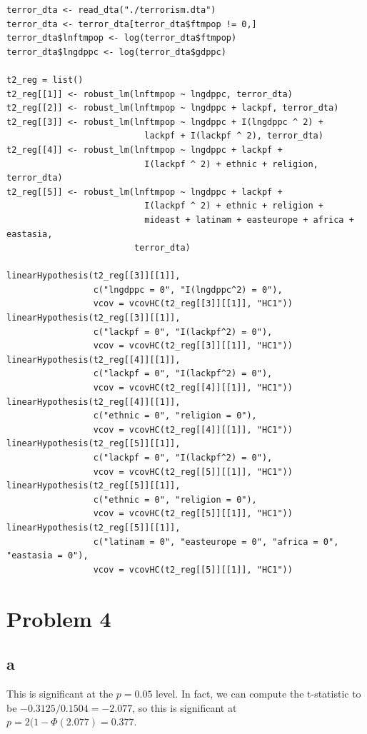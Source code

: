 \documentclass[12pt,letterpaper]{article}
\theoremstyle{definition}
\begin{document}
\begin{Verbatim}[fontsize=\small]
terror_dta <- read_dta("./terrorism.dta")
terror_dta <- terror_dta[terror_dta$ftmpop != 0,]
terror_dta$lnftmpop <- log(terror_dta$ftmpop)
terror_dta$lngdppc <- log(terror_dta$gdppc)

t2_reg = list()
t2_reg[[1]] <- robust_lm(lnftmpop ~ lngdppc, terror_dta)
t2_reg[[2]] <- robust_lm(lnftmpop ~ lngdppc + lackpf, terror_dta)
t2_reg[[3]] <- robust_lm(lnftmpop ~ lngdppc + I(lngdppc ^ 2) +
                           lackpf + I(lackpf ^ 2), terror_dta)
t2_reg[[4]] <- robust_lm(lnftmpop ~ lngdppc + lackpf +
                           I(lackpf ^ 2) + ethnic + religion, terror_dta)
t2_reg[[5]] <- robust_lm(lnftmpop ~ lngdppc + lackpf +
                           I(lackpf ^ 2) + ethnic + religion +
                           mideast + latinam + easteurope + africa + eastasia,
                         terror_dta)

linearHypothesis(t2_reg[[3]][[1]],
                 c("lngdppc = 0", "I(lngdppc^2) = 0"),
                 vcov = vcovHC(t2_reg[[3]][[1]], "HC1"))
linearHypothesis(t2_reg[[3]][[1]],
                 c("lackpf = 0", "I(lackpf^2) = 0"),
                 vcov = vcovHC(t2_reg[[3]][[1]], "HC1"))
linearHypothesis(t2_reg[[4]][[1]],
                 c("lackpf = 0", "I(lackpf^2) = 0"),
                 vcov = vcovHC(t2_reg[[4]][[1]], "HC1"))
linearHypothesis(t2_reg[[4]][[1]],
                 c("ethnic = 0", "religion = 0"),
                 vcov = vcovHC(t2_reg[[4]][[1]], "HC1"))
linearHypothesis(t2_reg[[5]][[1]],
                 c("lackpf = 0", "I(lackpf^2) = 0"),
                 vcov = vcovHC(t2_reg[[5]][[1]], "HC1"))
linearHypothesis(t2_reg[[5]][[1]],
                 c("ethnic = 0", "religion = 0"),
                 vcov = vcovHC(t2_reg[[5]][[1]], "HC1"))
linearHypothesis(t2_reg[[5]][[1]],
                 c("latinam = 0", "easteurope = 0", "africa = 0", "eastasia = 0"),
                 vcov = vcovHC(t2_reg[[5]][[1]], "HC1"))
\end{Verbatim}

\section*{Problem 4}

\subsection*{a}

This is significant at the $p = 0.05$ level. In fact, we can compute the t-statistic to be $-0.3125 / 0.1504 = -2.077$, so this is significant at $p = 2(1 - \Phi(2.077) = 0.377$.
\end{document}
